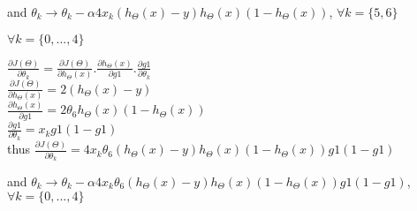 \documentclass[10pt]{article}
\begin{document}
\noindent and $\theta_{k} \to \theta_{k} - \alpha 4 x_{k} (h_{\Theta}(x) - y) h_{\Theta}(x) (1 - h_{\Theta}(x))$, $\forall k = \{5, 6\}$ \\

\noindent {}

\noindent $\forall k = \{0, ..., 4\}$ \\ \bigskip

\noindent $\frac{\partial J(\Theta)}{\partial \theta_{k}} = \frac{\partial J(\Theta)}{\partial h_{\Theta}(x)} . \frac{\partial h_{\Theta}(x)}{\partial g1} . \frac{\partial g1}{\partial \theta_{k}}$\\
\noindent $\frac{\partial J(\Theta)}{\partial h_{\Theta}(x)} = 2 (h_{\Theta}(x) - y)$ \\
\noindent $\frac{\partial h_{\Theta}(x)}{\partial g1} = 2 \theta_{6} h_{\Theta}(x) (1 - h_{\Theta}(x))$\\
\noindent $\frac{\partial g1}{\partial \theta_{k}} = x_{k} g1 (1 - g1)$\\
\noindent thus $\frac{\partial J(\Theta)}{\partial \theta_{k}} = 4 x_{k} \theta_{6} (h_{\Theta}(x) - y) h_{\Theta}(x) (1 - h_{\Theta}(x)) g1 (1 - g1)$ \\ \bigskip

\noindent and $\theta_{k} \to \theta_{k} - \alpha 4 x_{k} \theta_{6} (h_{\Theta}(x) - y) h_{\Theta}(x) (1 - h_{\Theta}(x)) g1 (1 - g1)$, $\forall k = \{0, ..., 4\}$
\end{document}
